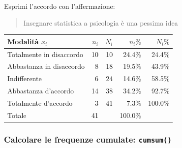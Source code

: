 \documentclass[
  a4paper,
  DIV=11,
  numbers=noendperiod]{scrreprt}
\newenvironment{Shaded}{\begin{snugshade}}{\end{snugshade}}
\newcommand{\AttributeTok}[1]{\textcolor[rgb]{0.13,0.29,0.53}{#1}}
\newcommand{\DecValTok}[1]{\textcolor[rgb]{0.00,0.00,0.81}{#1}}
\newcommand{\FunctionTok}[1]{\textcolor[rgb]{0.13,0.29,0.53}{\textbf{#1}}}
\newcommand{\NormalTok}[1]{#1}
\newcommand{\OtherTok}[1]{\textcolor[rgb]{0.56,0.35,0.01}{#1}}
\newcommand{\SpecialCharTok}[1]{\textcolor[rgb]{0.81,0.36,0.00}{\textbf{#1}}}
\newcommand{\StringTok}[1]{\textcolor[rgb]{0.31,0.60,0.02}{#1}}
\begin{document}
Esprimi l'accordo con l'affermazione:

\begin{quote}
Insegnare statistica a psicologia è una pessima idea
\end{quote}

\begin{table}[h]
\centering

\begin{tabular}{lrrrr}
\hline
Modalità $x_i$ & $n_i$ & $N_i$ & $n_i\%$ & $N_i\%$ \\
\hline
Totalmente in disaccordo  & 10 & 10 & 24.4\% & 24.4\% \\
Abbastanza in disaccordo  &  8 & 18 & 19.5\% & 43.9\% \\
Indifferente              &  6 & 24 & 14.6\% & 58.5\% \\
Abbastanza d'accordo      & 14 & 38 & 34.2\% & 92.7\% \\
Totalmente d'accordo      &  3 & 41 &  7.3\% & 100.0\% \\
\hline
Totale                     & 41 &    & 100.0\% & \\
\hline
\end{tabular}

\end{table}

\subsubsection{\texorpdfstring{Calcolare le frequenze cumulate:
\texttt{cumsum()}}{Calcolare le frequenze cumulate: cumsum()}}\label{calcolare-le-frequenze-cumulate-cumsum}

\begin{Shaded}
\end{Shaded}
\end{document}
